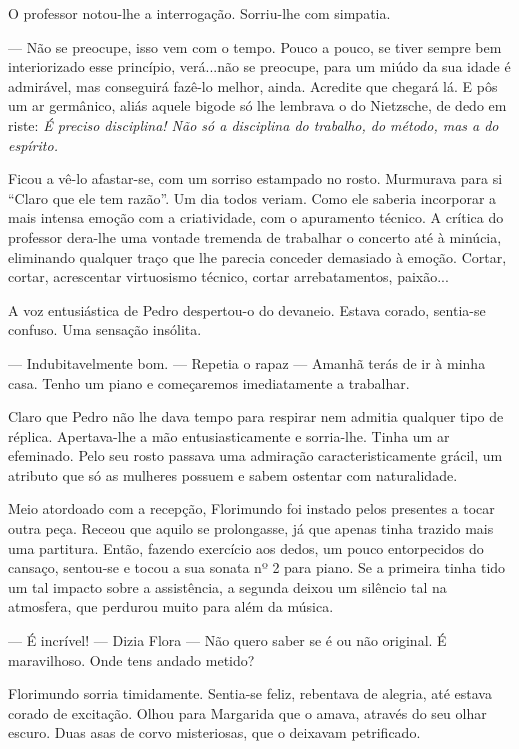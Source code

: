 O professor notou-lhe a interrogação. Sorriu-lhe com simpatia.

--- Não se preocupe, isso vem com o tempo. Pouco a pouco, se tiver sempre
bem interiorizado esse princípio, verá...não se preocupe, para um miúdo
da sua idade é admirável, mas conseguirá fazê-lo melhor, ainda. Acredite
que chegará lá. E pôs um ar germânico, aliás aquele bigode só lhe
lembrava o do Nietzsche, de dedo em riste: \emph{É preciso disciplina! Não só
a disciplina do trabalho, do método, mas a do espírito.}

Ficou a vê-lo afastar-se, com um sorriso estampado no rosto. Murmurava
para si ``Claro que ele tem razão''. Um dia todos veriam. Como ele saberia
incorporar a mais intensa emoção com a criatividade, com o apuramento
técnico. A crítica do professor dera-lhe uma vontade tremenda de
trabalhar o concerto até à minúcia, eliminando qualquer traço que lhe
parecia conceder demasiado à emoção. Cortar, cortar, acrescentar
virtuosismo técnico, cortar arrebatamentos, paixão...

A voz entusiástica de Pedro despertou-o do devaneio. Estava corado,
sentia-se confuso. Uma sensação insólita.

--- Indubitavelmente bom. --- Repetia o rapaz --- Amanhã terás de ir à minha
casa. Tenho um piano e começaremos imediatamente a trabalhar.

Claro que Pedro não lhe dava tempo para respirar nem admitia qualquer
tipo de réplica. Apertava-lhe a mão entusiasticamente e sorria-lhe.
Tinha um ar efeminado. Pelo seu rosto passava uma admiração
caracteristicamente grácil, um atributo que só as mulheres possuem e
sabem ostentar com naturalidade.

Meio atordoado com a recepção, Florimundo foi instado pelos presentes a
tocar outra peça. Receou que aquilo se prolongasse, já que apenas tinha
trazido mais uma partitura. Então, fazendo exercício aos dedos, um pouco
entorpecidos do cansaço, sentou-se e tocou a sua sonata nº 2 para piano.
Se a primeira tinha tido um tal impacto sobre a assistência, a segunda
deixou um silêncio tal na atmosfera, que perdurou muito para além da
música.

--- É incrível! --- Dizia Flora --- Não quero saber se é ou não original. É
maravilhoso. Onde tens andado metido?

Florimundo sorria timidamente. Sentia-se feliz, rebentava de alegria,
até estava corado de excitação. Olhou para Margarida que o amava,
através do seu olhar escuro. Duas asas de corvo misteriosas, que o
deixavam petrificado.

